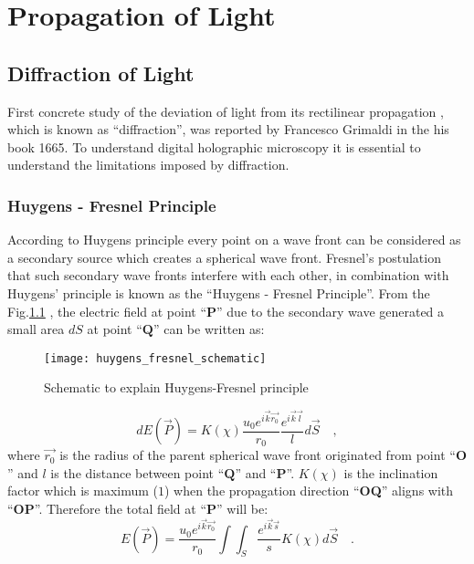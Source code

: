 \chapter{Propagation of Light}
\label{ch:propagation_of_light}


\section{Diffraction of Light}

First concrete study of the deviation of light from its rectilinear propagation \cite{hechtoptics}, which is known as ``diffraction'', was reported by Francesco Grimaldi \cite{bornwolf} in the his book 1665. To understand digital holographic microscopy \cite{Lee:07} it is essential to understand the limitations imposed by diffraction.

\subsection{Huygens - Fresnel Principle}
According to Huygens principle every point on a wave front can be considered as a secondary source which creates a spherical wave front. Fresnel's postulation that such secondary wave fronts interfere with each other, in combination with Huygens' principle is known as the ``Huygens - Fresnel Principle''. From the Fig.\ref{fig:huygens_fresnel} , the electric field at point ``$\mathbf{P}$'' due to the secondary wave generated a small area $dS$ at point ``$\mathbf{Q}$'' can be written as:

\begin{figure}[t!]
  \centering
  \texttt{[image: huygens\_fresnel\_schematic]}
  \caption{Schematic to explain Huygens-Fresnel principle}
  \label{fig:huygens_fresnel}
\end{figure}


\begin{equation}
\label{eq:huygen_fresnel}
dE(\vec{P}) = K(\chi) \frac{u_0 e^{i\vec{k}\vec{r_0}}}{r_0}\frac{e^{i\vec{k}\vec{l}}}{l} d\vec{S} \quad ,
\end{equation}
where $\vec{r_0}$ is the radius of the parent spherical wave front originated from point ``$\mathbf{O}$'' and $l$ is the distance between point ``$\mathbf{Q}$'' and ``$\mathbf{P}$''. $K(\chi)$ is the inclination factor which is maximum ($1$) when the propagation direction ``\textbf{OQ}'' aligns with ``\textbf{OP}''. Therefore the total field at ``\textbf{P}'' will be:
\begin{equation}
\label{eq:E_P}
E(\vec{P}) =  \frac{u_0 e^{i\vec{k}\vec{r_0}}}{r_0} \int \int _{S} \frac{e^{i\vec{k}\vec{s}}}{s}  K(\chi) d\vec{S} \quad .
\end{equation}

